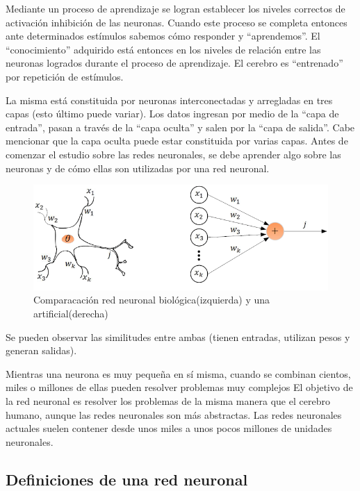 Mediante un proceso de aprendizaje se logran establecer los niveles correctos de activación inhibición de las neuronas. Cuando este proceso se completa entonces ante determinados estímulos sabemos cómo responder y “aprendemos”. El “conocimiento” adquirido está entonces en los niveles de relación entre las neuronas logrados durante el proceso de aprendizaje.  El cerebro es “entrenado” por repetición de estímulos.


La misma está constituida por neuronas interconectadas y arregladas en tres capas (esto último puede variar). Los datos ingresan por medio de la “capa de entrada”, pasan a través de la “capa oculta” y salen por la “capa de salida”. Cabe mencionar que la capa oculta puede estar constituida por varias capas. Antes de comenzar el estudio sobre las redes neuronales, se debe aprender algo sobre las neuronas y de cómo ellas son utilizadas por una red neuronal. 

\begin{figure}[h]
    \centering
    \includegraphics[width=.8\textwidth]{images/Figura-7-Neurona-biologica-versus-artificial-Una-neurona-artificial-es-una-unidad-de.png}
    \caption{Comparacación red neuronal biológica(izquierda) y una artificial(derecha)}
    \label{fig:img14}
\end{figure}

Se pueden observar las similitudes entre ambas (tienen entradas, utilizan pesos y generan salidas). 

Mientras una neurona es muy pequeña en sí misma, cuando se combinan cientos,
miles o millones de ellas pueden resolver problemas muy complejos
El objetivo de la red neuronal es resolver los problemas de la misma manera que el cerebro humano, aunque las redes neuronales son más abstractas. Las redes neuronales actuales suelen contener desde unos miles a unos pocos millones de unidades neuronales.

\subsection{Definiciones de una red neuronal}

